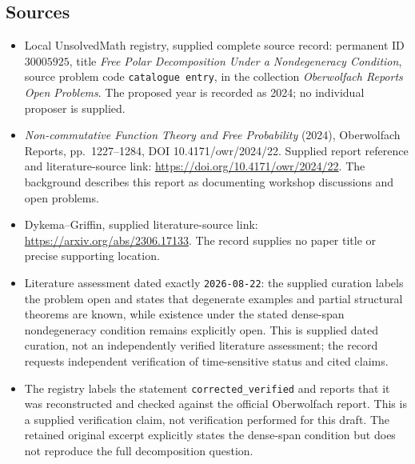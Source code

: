 \documentclass[11pt]{article}
\begin{document}
\subsection{Sources}
\begin{itemize}
\item Local UnsolvedMath registry, supplied complete source record: permanent ID \(30005925\), title \emph{Free Polar Decomposition Under a Nondegeneracy Condition}, source problem code \texttt{catalogue entry}, in the collection \emph{Oberwolfach Reports Open Problems}. The proposed year is recorded as 2024; no individual proposer is supplied.
\item \emph{Non-commutative Function Theory and Free Probability} (2024), Oberwolfach Reports, pp.~1227--1284, DOI 10.4171/owr/2024/22. Supplied report reference and literature-source link: \url{https://doi.org/10.4171/owr/2024/22}. The background describes this report as documenting workshop discussions and open problems.
\item Dykema--Griffin, supplied literature-source link: \url{https://arxiv.org/abs/2306.17133}. The record supplies no paper title or precise supporting location.
\item Literature assessment dated exactly \texttt{2026-08-22}: the supplied curation labels the problem open and states that degenerate examples and partial structural theorems are known, while existence under the stated dense-span nondegeneracy condition remains explicitly open. This is supplied dated curation, not an independently verified literature assessment; the record requests independent verification of time-sensitive status and cited claims.
\item The registry labels the statement \texttt{corrected\_verified} and reports that it was reconstructed and checked against the official Oberwolfach report. This is a supplied verification claim, not verification performed for this draft. The retained original excerpt explicitly states the dense-span condition but does not reproduce the full decomposition question.
\end{itemize}
\end{document}
